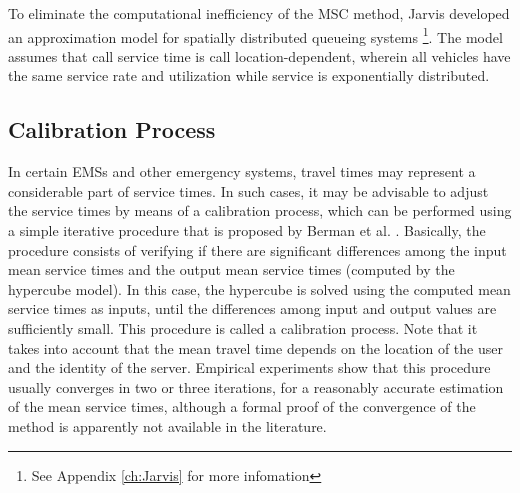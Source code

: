 To eliminate the computational inefficiency of the MSC method,
Jarvis \cite{jarvis1985approximating} developed
an approximation model
for spatially distributed queueing systems
\footnote{See Appendix \ref{ch:Jarvis} for more infomation}.
The model assumes that call service time
is call location-dependent,
wherein all vehicles
have the same service rate and utilization
while service is exponentially distributed.

\subsection{Calibration Process}
In certain EMSs
and other emergency systems,
travel times may represent
a considerable part of service times.
In such cases,
it may be advisable
to adjust the service times
by means of a calibration process,
which can be performed
using a simple iterative procedure
that is proposed by Berman et al. \cite{berman1987stochastic}.
Basically,
the procedure consists of
verifying
if there are
significant differences among the input mean service times
and the output mean service times (computed by the hypercube model).
In this case,
the hypercube is solved
using the computed mean service times as inputs,
until
the differences
among input and output values
are sufficiently small.
This procedure is called
a calibration process.
Note that
it takes into account
that the mean travel time
depends on the location of the user
and the identity of the server.
Empirical experiments show
that this procedure
usually converges in two or three iterations,
for a reasonably accurate estimation of the mean service times,
although a formal proof of the convergence of the method
is apparently not available in the literature.
